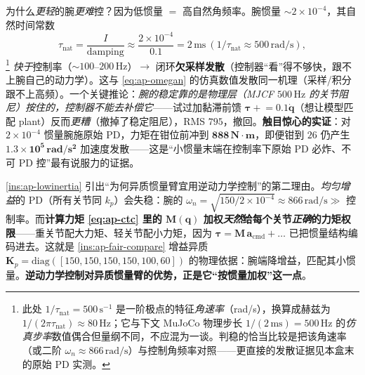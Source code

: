 \begin{insight}[低惯量 $=$ 高自然频率 $=$ 控制率欠采样发散]\label{ins:ap-lowinertia}
为什么\emph{更轻}的腕\emph{更难}控？因为低惯量 $=$ 高自然角频率。腕惯量 $\sim2\times10^{-4}$，其自然时间常数
\begin{equation}
  \tau_{\mathrm{nat}}=\frac{I}{\text{damping}}\approx\frac{2\times10^{-4}}{0.1}=2\,\mathrm{ms}\ (1/\tau_{\mathrm{nat}}\approx 500\,\mathrm{rad/s}),
  \label{eq:ap-taunat}
\end{equation}\footnote{此处 $1/\tau_{\mathrm{nat}}=500\,\mathrm{s^{-1}}$ 是一阶极点的特征\emph{角速率}（rad/s），换算成赫兹为 $1/(2\pi\tau_{\mathrm{nat}})\approx 80\,\mathrm{Hz}$；它与下文 MuJoCo 物理步长 $1/(2\,\mathrm{ms})=500\,\mathrm{Hz}$ 的\emph{仿真步率}数值偶合但量纲不同，不应混为一谈。判稳的恰当比较是把该角速率（或二阶 $\omega_n\approx866\,\mathrm{rad/s}$）与控制角频率对照——更直接的发散证据见本盒末的原始 PD 实测。}
\emph{快于}控制率（$\sim100$--$200\,\mathrm{Hz}$）$\to$ 闭环\textbf{欠采样发散}（控制器“看”得不够快，跟不上腕自己的动力学）。这与 \cref{eq:ap-omegan} 的仿真数值发散同一机理（采样/积分跟不上高频）。一个关键推论：\emph{腕的稳定靠的是物理层（MJCF $500\,\mathrm{Hz}$ 的关节阻尼）按住的，控制器\emph{不能}去补偿它}——试过加黏滞前馈 $\boldsymbol{\tau}\mathrel{+}=0.1\dot{\mathbf{q}}$（想让模型匹配 plant）反而\emph{更糟}（撤掉了稳定阻尼），RMS $795$，撤回。\textbf{触目惊心的实证}：对 $2\times10^{-4}$ 惯量腕施原始 PD，力矩在钳位前冲到 $\mathbf{888\,N\!\cdot\! m}$，即便钳到 $26$ 仍产生 $\mathbf{1.3\times10^{5}\,rad/s^2}$ 加速度发散——这是“小惯量末端在控制率下原始 PD 必炸、不可 PD 控”最有说服力的证据。
\end{insight}

\begin{insight}\label{ins:ap-M-weighting}
\cref{ins:ap-lowinertia} 引出“为何异质惯量臂宜用逆动力学控制”的第二理由。\emph{均匀增益}的 PD（所有关节同 $k_p$）会失稳：腕的 $\omega_n=\sqrt{150/2\times10^{-4}}\approx 866\,\mathrm{rad/s}\gg$ 控制率。而\textbf{计算力矩 \cref{eq:ap-ctc} 里的 $\mathbf{M}(\mathbf{q})$ 加权\emph{天然}给每个关节\emph{正确}的力矩权限}——重关节配大力矩、轻关节配小力矩，因为 $\boldsymbol{\tau}=\mathbf{M}\,\mathbf{a}_{\mathrm{cmd}}+\dots$ 已把惯量结构编码进去。这就是 \cref{ins:ap-fair-compare} 增益异质 $\mathbf{K}_p=\mathrm{diag}([150,150,150,150,100,60])$ 的物理依据：腕端降增益，匹配其小惯量。\textbf{逆动力学控制对异质惯量臂的优势，正是它“按惯量加权”这一点}。
\end{insight}

